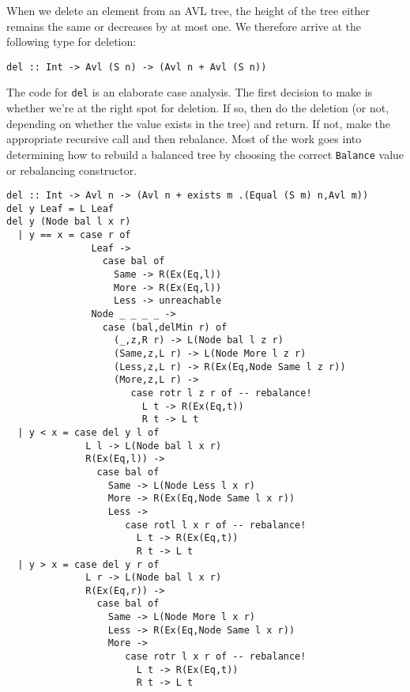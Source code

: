 When we delete an element from an AVL tree, the height of the
tree either remains the same or decreases by at most one.
We therefore arrive at the following type for deletion:

{\small
\begin{verbatim}
del :: Int -> Avl (S n) -> (Avl n + Avl (S n))
\end{verbatim}
}
The code for \verb|del| is an elaborate case analysis.
The first decision to make is whether we're at the right spot for 
deletion.  If so, then do the deletion (or not, depending on whether 
the value exists in the tree) and return.  If not, make the appropriate 
recursive call and then rebalance.
Most of the work goes into determining how to rebuild a balanced tree 
by choosing the correct \verb|Balance| value or rebalancing constructor.

{\small
\begin{verbatim}
del :: Int -> Avl n -> (Avl n + exists m .(Equal (S m) n,Avl m))
del y Leaf = L Leaf
del y (Node bal l x r)
  | y == x = case r of
               Leaf ->  
                 case bal of
                   Same -> R(Ex(Eq,l))
                   More -> R(Ex(Eq,l))
                   Less -> unreachable
               Node _ _ _ _ ->
                 case (bal,delMin r) of
                   (_,z,R r) -> L(Node bal l z r)
                   (Same,z,L r) -> L(Node More l z r)
                   (Less,z,L r) -> R(Ex(Eq,Node Same l z r))
                   (More,z,L r) -> 
                      case rotr l z r of -- rebalance!
                        L t -> R(Ex(Eq,t))
                        R t -> L t
  | y < x = case del y l of
              L l -> L(Node bal l x r)
              R(Ex(Eq,l)) -> 
                case bal of
                  Same -> L(Node Less l x r)
                  More -> R(Ex(Eq,Node Same l x r))
                  Less -> 
                     case rotl l x r of -- rebalance!
                       L t -> R(Ex(Eq,t))
                       R t -> L t
  | y > x = case del y r of
              L r -> L(Node bal l x r)
              R(Ex(Eq,r)) -> 
                case bal of
                  Same -> L(Node More l x r)
                  Less -> R(Ex(Eq,Node Same l x r))
                  More -> 
                     case rotr l x r of -- rebalance!
                       L t -> R(Ex(Eq,t))
                       R t -> L t
\end{verbatim}
}

